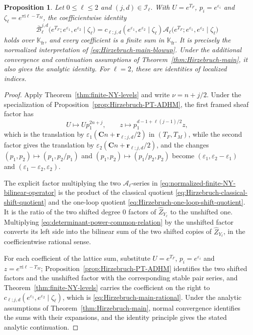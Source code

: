 \documentclass{amsart}
\newtheorem{proposition}{Proposition}
\theoremstyle{definition}
\numberwithin{equation}{section}
\newcommand{\K}{\mathbb K}
\newcommand{\eps}{\varepsilon}
\begin{document}
\begin{proposition}
\label{prop:Hirzebruch-main-rational}
Let \(0\leq\ell\leq2\) and \((j,d)\in\mathcal I_\ell\).  With \(U=e^{T_F}\), \(p_i=e^{\eps_i}\) and \(\zeta_\ell=e^{\pi\mathrm{i}\ell-T_M}\), the coefficientwise identity
\begin{equation}
 \overline{\mathscr B}_{\ell}^{j,d}
 \bigl(e^{T_F};e^{\eps_1},e^{\eps_2}\mid\zeta_\ell\bigr)
 =c_{\ell;j,d}(e^{\eps_1},e^{\eps_2}\mid\zeta_\ell)
  \mathcal A_\ell
  \bigl(e^{T_F};e^{\eps_1},e^{\eps_2}\mid\zeta_\ell\bigr)
\label{eq:Hirzebruch-main-rational}
\end{equation}
holds over \(\K_{\mathrm{fr}}\), and every coefficient is a finite sum in \(\K_{\mathrm{fr}}\).  It is precisely the normalized interpretation of \eqref{eq:Hirzebruch-main-blowup}.  Under the additional convergence and continuation assumptions of Theorem~\ref{thm:Hirzebruch-main}, it also gives the analytic identity.  For \(\ell=2\), these are identities of localized indices.
\end{proposition}

\begin{proof}
Apply Theorem~\ref{thm:finite-NY-levels} and write \(\nu=n+j/2\).  Under the specialization of Proposition~\ref{prop:Hirzebruch-PT-ADHM}, the first framed sheaf factor has
\[
 U\longmapsto Up_1^{2n+j},\qquad
 z\longmapsto p_1^{d-1+\ell(j-1)/2}z,
\]
which is the translation by \(\eps_1(\mathbf Cn+\mathbf r_{\ell;j,d}/2)\) in \((T_F,T_M)\), while the second factor gives the translation by \(\eps_2(\mathbf Cn+\mathbf r_{\ell;j,d}/2)\), and the changes \((p_1,p_2)\mapsto(p_1,p_2/p_1)\) and \((p_1,p_2)\mapsto(p_1/p_2,p_2)\) become \((\eps_1,\eps_2-\eps_1)\) and \((\eps_1-\eps_2,\eps_2)\).

The explicit factor multiplying the two \(\mathcal A_\ell\)-series in \eqref{eq:normalized-finite-NY-bilinear-operator} is the product of the classical quotient \eqref{eq:Hirzebruch-classical-shift-quotient} and the one-loop quotient \eqref{eq:Hirzebruch-one-loop-shift-quotient}.  It is the ratio of the two shifted degree \(0\) factors of \(\widehat Z_{Y_\ell}\) to the unshifted one.  Multiplying \eqref{eq:determinant-power-common-relation} by the unshifted factor converts its left side into the bilinear sum of the two shifted copies of \(\widehat Z_{Y_\ell}\), in the coefficientwise rational sense.

For each coefficient of the lattice sum, substitute \(U=e^{T_F}\), \(p_i=e^{\eps_i}\) and \(z=e^{\pi\mathrm{i}\ell-T_M}\); Proposition~\ref{prop:Hirzebruch-PT-ADHM} identifies the two shifted factors and the unshifted factor with the corresponding stable pair series, and Theorem~\ref{thm:finite-NY-levels} carries the coefficient on the right to \(c_{\ell;j,d}(e^{\eps_1},e^{\eps_2}\mid\zeta_\ell)\), which is \eqref{eq:Hirzebruch-main-rational}.  Under the analytic assumptions of Theorem~\ref{thm:Hirzebruch-main}, normal convergence identifies the sums with their expansions, and the identity principle gives the stated analytic continuation.
\end{proof}
\end{document}

